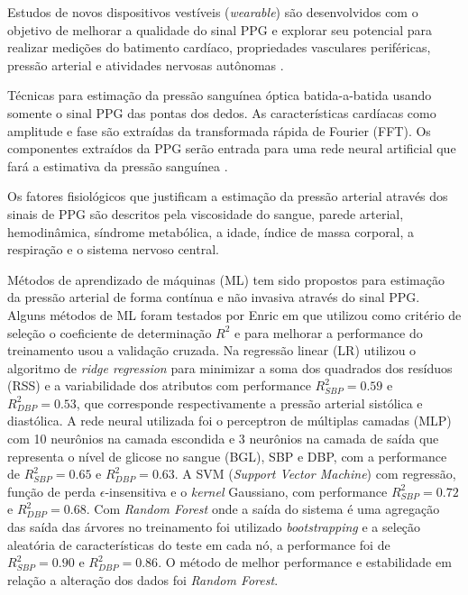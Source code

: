 \documentclass[conference,compsoc]{IEEEtran}
\begin{document}
Estudos de novos dispositivos vest\'iveis (\textit{wearable}) s\~ao desenvolvidos com o objetivo de melhorar a qualidade do sinal PPG e explorar seu potencial para realizar medi\c{c}\~oes do batimento card\'iaco, propriedades vasculares perif\'ericas, press\~ao arterial e atividades nervosas aut\^onomas \cite{GEUN:2008}.

T\'ecnicas para estima\c{c}\~ao da press\~ao sangu\'inea \'optica batida-a-batida usando somente o sinal PPG das pontas dos dedos. As caracter\'isticas card\'iacas como amplitude e fase s\~ao extra\'idas da transformada r\'apida de Fourier (FFT). Os componentes extra\'idos da PPG ser\~ao entrada para uma rede neural artificial que far\'a a estimativa da press\~ao sangu\'inea \cite{XING:2016}.

Os fatores fisiol\'ogicos que justificam a estima\c{c}\~ao da press\~ao arterial atrav\'es dos sinais de PPG s\~ao descritos pela viscosidade do sangue, parede arterial, hemodin\^amica, s\'indrome metab\'olica, a idade, \'indice de massa corporal, a respira\c{c}\~ao e o sistema nervoso central. \cite{MORENO:2011}


M\'etodos de aprendizado de m\'aquinas (ML) tem sido propostos para estima\c{c}\~ao da press\~ao arterial de forma cont\'inua e n\~ao invasiva atrav\'es do sinal PPG. 
Alguns m\'etodos de ML foram testados por Enric em \cite{MORENO:2011} que utilizou como crit\'erio de sele\c{c}\~ao o coeficiente de determina\c{c}\~ao $R^2$ e para melhorar a performance do treinamento usou a valida\c{c}\~ao cruzada. 
Na regress\~ao linear (LR) utilizou o algoritmo de \textit{ridge regression} para minimizar a soma dos quadrados dos res\'iduos (RSS) e a variabilidade dos atributos com performance $R^2_{SBP} = 0.59$ e $R^2_{DBP} = 0.53$, que corresponde respectivamente a press\~ao arterial sist\'olica e diast\'olica.
A rede neural utilizada foi o perceptron de m\'ultiplas camadas (MLP) com 10 neur\^onios na camada escondida e 3 neur\^onios na camada de sa\'ida que representa o n\'ivel de glicose no sangue (BGL), SBP e DBP, com a performance de $R^2_{SBP} = 0.65$ e $R^2_{DBP} = 0.63$.  A SVM (\textit{Support Vector Machine}) com regress\~ao, fun\c{c}\~ao de perda $\epsilon$-insensitiva e 
o \textit{kernel} Gaussiano, com performance $R^2_{SBP} = 0.72$ e $R^2_{DBP} = 0.68$. Com \textit{Random Forest} onde a sa\'ida do sistema \'e uma agrega\c{c}\~ao das sa\'ida das \'arvores no treinamento foi utilizado \textit{bootstrapping} e a sele\c{c}\~ao aleat\'oria de caracter\'isticas do teste em cada n\'o, a performance foi de $R^2_{SBP} = 0.90$ e $R^2_{DBP} = 0.86$. O m\'etodo de melhor performance e estabilidade em rela\c{c}\~ao a altera\c{c}\~ao dos dados foi \textit{Random Forest}.
\end{document}
